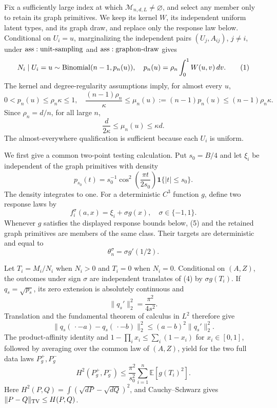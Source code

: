 Fix a sufficiently large index at which \(\mathcal M_{n,d,L}\ne\varnothing\), and select any member only to retain its graph primitives.  We keep its kernel \(W\), its independent uniform latent types, and its graph draw, and replace only the response law below.  Conditional on \(U_i=u\), marginalizing the independent pairs \((U_j,A_{ij})\), \(j\ne i\), under \({\rm ass:unit\text{-}sampling}\) and \({\rm ass:graphon\text{-}draw}\) gives
\[
 N_i\mid U_i=u\sim{\rm Binomial}(n-1,p_n(u)),
 \quad p_n(u)=\rho_n\int_0^1W(u,v)\,dv.
\tag{1}
\]
The kernel and degree-regularity assumptions imply, for almost every \(u\),
\[
 0<p_n(u)\leq\rho_n\kappa\leq1,\quad
 \frac{(n-1)\rho_n}{\kappa}
 \leq\mu_n(u):=(n-1)p_n(u)
 \leq(n-1)\rho_n\kappa.
\tag{2}
\]
Since \(\rho_n=d/n\), for all large \(n\),
\[
 \frac d{2\kappa}\leq\mu_n(u)\leq\kappa d.
\tag{3}
\]
The almost-everywhere qualification is sufficient because each \(U_i\) is uniform.

We first give a common two-point testing calculation.  Put \(s_0=B/4\) and let \(\xi_i\) be independent of the graph primitives with density
\[
 p_{s_0}(t)=s_0^{-1}\cos^2\!\left(\frac{\pi t}{2s_0}\right)
 \mathbf1\{|t|\leq s_0\}.
\tag{4}
\]
The density integrates to one.  For a deterministic \(C^3\) function \(g\), define two response laws by
\[
 f_i^\sigma(a,x)=\xi_i+\sigma g(x),\quad \sigma\in\{-1,1\}.
\tag{5}
\]
Whenever \(g\) satisfies the displayed response bounds below, (5) and the retained graph primitives are members of the same class.  Their targets are deterministic and equal to
\[
 \theta_n^\sigma=\sigma g'(1/2).
\tag{6}
\]

Let \(T_i=M_i/N_i\) when \(N_i>0\) and \(T_i=0\) when \(N_i=0\).  Conditional on \((A,Z)\), the outcomes under sign \(\sigma\) are independent translates of (4) by \(\sigma g(T_i)\).  If \(q_s=\sqrt{p_s}\), its zero extension is absolutely continuous and
\[
 \|q_s'\|_2^2=\frac{\pi^2}{4s^2}.
\tag{7}
\]
Translation and the fundamental theorem of calculus in \(L^2\) therefore give
\[
 \|q_s(\,\cdot-a)-q_s(\,\cdot-b)\|_2^2
 \leq(a-b)^2\|q_s'\|_2^2.
\tag{8}
\]
The product-affinity identity and \(1-\prod_i x_i\leq\sum_i(1-x_i)\) for \(x_i\in[0,1]\), followed by averaging over the common law of \((A,Z)\), yield for the two full data laws \(P_g^+,P_g^-\)
\[
 H^2(P_g^+,P_g^-)
 \leq\frac{\pi^2}{s_0^2}\sum_{i=1}^n\mathbb E[g(T_i)^2].
\tag{9}
\]
Here \(H^2(P,Q)=\int(\sqrt{dP}-\sqrt{dQ})^2\), and Cauchy--Schwarz gives \(\|P-Q\|_{\rm TV}\leq H(P,Q)\).

